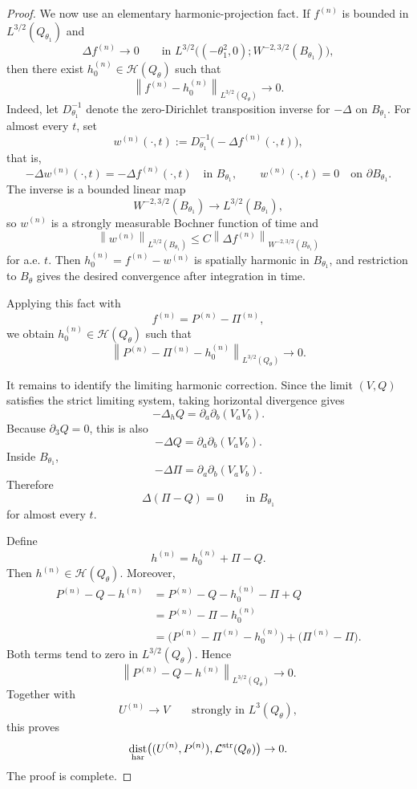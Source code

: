 \documentclass[11pt]{article}
\numberwithin{equation}{section}
\theoremstyle{plain}
\theoremstyle{definition}
\theoremstyle{remark}
\DeclareMathOperator{\dist}{dist}
\newcommand{\norm}[2]{\left\|#1\right\|_{#2}}
\newcommand{\calH}{\mathcal H}
\newcommand{\calL}{\mathcal L}
\begin{document}
\begin{proof}
We now use an elementary harmonic-projection fact.  If \(f^{(n)}\) is bounded in \(L^{3/2}(Q_{\theta_1})\) and
\[
        \Delta f^{(n)}\to0
        \qquad\text{in }
        L^{3/2}\bigl((-\theta_1^2,0);W^{-2,3/2}(B_{\theta_1})\bigr),
\]
then there exist \(h_0^{(n)}\in\calH(Q_\theta)\) such that
\[
        \norm{f^{(n)}-h_0^{(n)}}{L^{3/2}(Q_\theta)}\to0 .
\]
Indeed, let \(D^{-1}_{\theta_1}\) denote the zero-Dirichlet transposition inverse for \(-\Delta\) on \(B_{\theta_1}\).  For almost every \(t\), set
\[
        w^{(n)}(\cdot,t)
        :=D^{-1}_{\theta_1}\bigl(-\Delta f^{(n)}(\cdot,t)\bigr),
\]
that is,
\[
        -\Delta w^{(n)}(\cdot,t)
        =
        -\Delta f^{(n)}(\cdot,t)
        \quad\text{in }B_{\theta_1},
        \qquad
        w^{(n)}(\cdot,t)=0
        \quad\text{on }\partial B_{\theta_1}.
\]
The inverse is a bounded linear map
\[
        W^{-2,3/2}(B_{\theta_1})\longrightarrow L^{3/2}(B_{\theta_1}),
\]
so \(w^{(n)}\) is a strongly measurable Bochner function of time and
\[
        \norm{w^{(n)}}{L^{3/2}(B_{\theta_1})}
        \le
        C\norm{\Delta f^{(n)}}{W^{-2,3/2}(B_{\theta_1})}
\]
for a.e. \(t\).  Then \(h_0^{(n)}=f^{(n)}-w^{(n)}\) is spatially harmonic in \(B_{\theta_1}\), and restriction to \(B_\theta\) gives the desired convergence after integration in time.

Applying this fact with
\[
        f^{(n)}=P^{(n)}-\Pi^{(n)},
\]
we obtain \(h_0^{(n)}\in\calH(Q_\theta)\) such that
\[
        \norm{P^{(n)}-\Pi^{(n)}-h_0^{(n)}}{L^{3/2}(Q_\theta)}\to0 .
\]

It remains to identify the limiting harmonic correction.  Since the limit \((V,Q)\) satisfies the strict limiting system, taking horizontal divergence gives
\[
        -\Delta_hQ
        =
        \partial_a\partial_b(V_aV_b).
\]
Because \(\partial_3Q=0\), this is also
\[
        -\Delta Q
        =
        \partial_a\partial_b(V_aV_b).
\]
Inside \(B_{\theta_1}\),
\[
        -\Delta\Pi
        =
        \partial_a\partial_b(V_aV_b).
\]
Therefore
\[
        \Delta(\Pi-Q)=0
        \qquad\text{in }B_{\theta_1}
\]
for almost every \(t\).

Define
\[
        h^{(n)}=h_0^{(n)}+\Pi-Q .
\]
Then \(h^{(n)}\in\calH(Q_\theta)\).  Moreover,
\begin{align*}
P^{(n)}-Q-h^{(n)}
&=P^{(n)}-Q-h_0^{(n)}-\Pi+Q
\\
&=P^{(n)}-\Pi-h_0^{(n)}
\\
&=\bigl(P^{(n)}-\Pi^{(n)}-h_0^{(n)}\bigr)
+\bigl(\Pi^{(n)}-\Pi\bigr).
\end{align*}
Both terms tend to zero in \(L^{3/2}(Q_\theta)\).  Hence
\[
        \norm{P^{(n)}-Q-h^{(n)}}{L^{3/2}(Q_\theta)}\to0 .
\]
Together with
\[
        U^{(n)}\to V
        \qquad\text{strongly in }L^3(Q_\theta),
\]
this proves
\[
        \dist_{\rm har}
        \bigl((U^{(n)},P^{(n)}),\calL^{\rm str}(Q_\theta)\bigr)
        \to0 .
\]
The proof is complete.
\end{proof}
\end{document}
